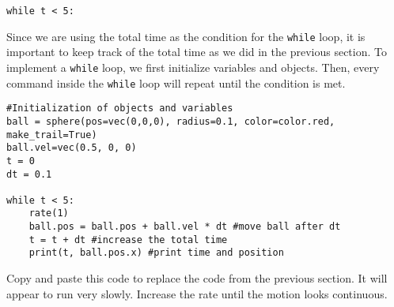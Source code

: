 \begin{verbatim}
while t < 5:
\end{verbatim}

Since we are using the total time as the condition for the \texttt{while} loop, it is important to keep track of the total time as we did in the previous section. To implement a \texttt{while} loop, we first initialize variables and objects. Then, every command inside the \texttt{while} loop will repeat until the condition is met.

\begin{verbatim}
#Initialization of objects and variables
ball = sphere(pos=vec(0,0,0), radius=0.1, color=color.red, make_trail=True)
ball.vel=vec(0.5, 0, 0)
t = 0
dt = 0.1

while t < 5:
	rate(1)
	ball.pos = ball.pos + ball.vel * dt #move ball after dt
	t = t + dt #increase the total time
	print(t, ball.pos.x) #print time and position
\end{verbatim}

Copy and paste this code to replace the code from the previous section. It will appear to run very slowly. Increase the rate until the motion looks continuous.

